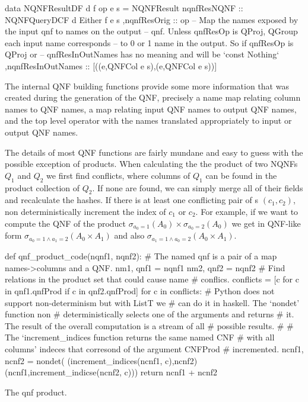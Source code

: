 \begin{code}
  \begin{haskellcode}
    data NQNFResultDF d f op e s =
    NQNFResult
    { nqnfResNQNF :: NQNFQueryDCF d Either f e s
      ,nqnfResOrig :: op
      -- Map the names exposed by the input qnf to names on the output
      -- qnf. Unless qnfResOp is QProj, QGroup each input name corresponds
      -- to 0 or 1 name in the output. So if qnfResOp is QProj or
      -- qnfResInOutNames has no meaning and will be `const Nothing`
      ,nqnfResInOutNames :: [((e,QNFCol e s),(e,QNFCol e s))]
    }
  \end{haskellcode}
  \caption{\label{lst:qnf_result}The internal QNF building functions
    provide some more information that was created during the
    generation of the QNF, precisely a name map relating column names
    to QNF names, a map relating input QNF names to output QNF names,
    and the top level operator with the names translated appropriately
    to input or output QNF names.}
\end{code}

The details of most QNF functions are fairly mundane and easy to guess
with the possible exception of products. When calculating the
the product of two NQNFs \(Q_1\) and \(Q_2\) we first find conflicts,
where columns of \(Q_1\) can be found in the product collection of
\(Q_2\). If none are found, we can simply merge all of their fields and recalculate the hashes.
If there is at least one conflicting pair of s \((c_1,c_2)\), non deterministically
increment the index of \(c_1\) or \(c_2\). For example, if we want to compute the QNF of the product
\(\sigma_{a_0=1}(A_0) \times \sigma_{a_0=2}(A_0)\) we get in QNF-like
form \(\sigma_{a_0=1 \land a_1=2} (A_0 \times A_1)\) and also
\(\sigma_{a_1=1 \land a_0=2} (A_0 \times A_1)\).

\begin{code}
  \begin{pycode}
    def qnf_product_code(nqnf1, nqnf2):
        # The named qnf is a pair of a map names->columns and a QNF.
        nm1, qnf1 = nqnf1
        nm2, qnf2 = nqnf2
        # Find relations in the product set that could cause name
        # conflics.
        conflicts = [c for c in qnf1.qnfProd if c in qnf2.qnfProd]
        for c in conflicts:
            # Python does not support non-determinism but with ListT we
            # can do it in haskell. The `nondet' function non
            # deterministically selects one of the arguments and returns
            # it. The result of the overall computation is a stream of all
            # possible results.
            #
            # The `increment_indices function returns the same named CNF
            # with all columns' indeces that corresond of the argument CNFProd
            # incremented.
            ncnf1, ncnf2 = nondet(
                (increment_indices(ncnf1, c),ncnf2)
                (ncnf1,increment_indicse(ncnf2, c)))
        return ncnf1 + ncnf2
\end{pycode}
  \caption{\label{lst:qnf_product}The qnf product.}
\end{code}


